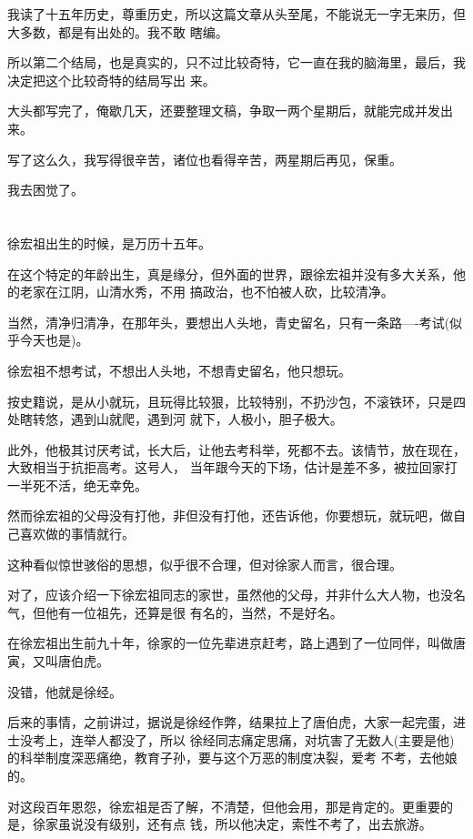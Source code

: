 \documentclass[11pt,a4paper,onecolumn]{article}
\begin{document}
我读了十五年历史，尊重历史，所以这篇文章从头至尾，不能说无一字无来历，但大多数，都是有出处的。我不敢
瞎编。

所以第二个结局，也是真实的，只不过比较奇特，它一直在我的脑海里，最后，我决定把这个比较奇特的结局写出
来。

大头都写完了，俺歇几天，还要整理文稿，争取一两个星期后，就能完成并发出来。

写了这么久，我写得很辛苦，诸位也看得辛苦，两星期后再见，保重。

我去困觉了。

\section[\thesection]{}

徐宏祖出生的时候，是万历十五年。

在这个特定的年龄出生，真是缘分，但外面的世界，跟徐宏祖并没有多大关系，他的老家在江阴，山清水秀，不用
搞政治，也不怕被人砍，比较清净。

当然，清净归清净，在那年头，要想出人头地，青史留名，只有一条路----考试(似乎今天也是)。

徐宏祖不想考试，不想出人头地，不想青史留名，他只想玩。

按史籍说，是从小就玩，且玩得比较狠，比较特别，不扔沙包，不滚铁环，只是四处瞎转悠，遇到山就爬，遇到河
就下，人极小，胆子极大。

此外，他极其讨厌考试，长大后，让他去考科举，死都不去。该情节，放在现在，大致相当于抗拒高考。这号人，
当年跟今天的下场，估计是差不多，被拉回家打一半死不活，绝无幸免。

然而徐宏祖的父母没有打他，非但没有打他，还告诉他，你要想玩，就玩吧，做自己喜欢做的事情就行。

这种看似惊世骇俗的思想，似乎很不合理，但对徐家人而言，很合理。

对了，应该介绍一下徐宏祖同志的家世，虽然他的父母，并非什么大人物，也没名气，但他有一位祖先，还算是很
有名的，当然，不是好名。

在徐宏祖出生前九十年，徐家的一位先辈进京赶考，路上遇到了一位同伴，叫做唐寅，又叫唐伯虎。

没错，他就是徐经。

后来的事情，之前讲过，据说是徐经作弊，结果拉上了唐伯虎，大家一起完蛋，进士没考上，连举人都没了，所以
徐经同志痛定思痛，对坑害了无数人(主要是他)的科举制度深恶痛绝，教育子孙，要与这个万恶的制度决裂，爱考
不考，去他娘的。

对这段百年恩怨，徐宏祖是否了解，不清楚，但他会用，那是肯定的。更重要的是，徐家虽说没有级别，还有点
钱，所以他决定，索性不考了，出去旅游。
\end{document}
